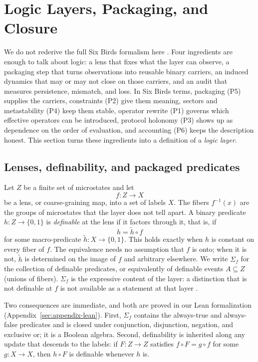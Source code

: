 \section{Logic Layers, Packaging, and Closure}
\label{sec:framework}

We do not rederive the full Six Birds formalism here \cite{tsiokos2026sixbirds}. Four ingredients are enough to talk about logic: a lens that fixes what the layer can observe, a packaging step that turns observations into reusable binary carriers, an induced dynamics that may or may not close on those carriers, and an audit that measures persistence, mismatch, and loss. In Six Birds terms, packaging (P5) supplies the carriers, constraints (P2) give them meaning, sectors and metastability (P4) keep them stable, operator rewrite (P1) governs which effective operators can be introduced, protocol holonomy (P3) shows up as dependence on the order of evaluation, and accounting (P6) keeps the description honest. This section turns these ingredients into a definition of a \emph{logic layer}.

\subsection{Lenses, definability, and packaged predicates}

Let \(Z\) be a finite set of microstates and let
\[
f: Z \to X
\]
be a lens, or coarse-graining map, into a set of labels \(X\). The fibers \(f^{-1}(x)\) are the groups of microstates that the layer does not tell apart. A binary predicate \(h: Z \to \{0,1\}\) is \emph{definable} at the lens if it factors through it, that is, if
\[
h = \tilde h \circ f
\]
for some macro-predicate \(\tilde h : X \to \{0,1\}\). This holds exactly when \(h\) is constant on every fiber of \(f\). The equivalence needs no assumption that \(f\) is onto; when it is not, \(\tilde h\) is determined on the image of \(f\) and arbitrary elsewhere. We write \(\Sigma_f\) for the collection of definable predicates, or equivalently of definable events \(A \subseteq Z\) (unions of fibers). \(\Sigma_f\) is the expressive content of the layer: a distinction that is not definable at \(f\) is not available as a statement at that layer \cite{pawlak1982rough,ellerman2010partitions,shalizi2025macrostate}.

Two consequences are immediate, and both are proved in our Lean formalization (Appendix~\ref{sec:appendix-lean}). First, \(\Sigma_f\) contains the always-true and always-false predicates and is closed under conjunction, disjunction, negation, and exclusive or; it is a Boolean algebra. Second, definability is inherited along any update that descends to the labels: if \(F: Z\to Z\) satisfies \(f\circ F = g\circ f\) for some \(g: X \to X\), then \(h\circ F\) is definable whenever \(h\) is.

